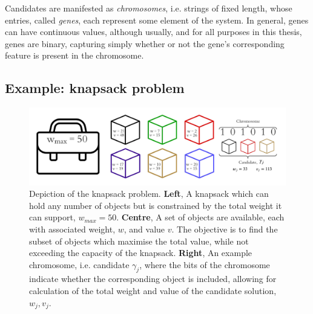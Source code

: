 Candidates are manifested as \emph{\glspl{chromosome}}, i.e. strings of fixed length, 
    whose entries, called  \emph{\glspl{gene}}, each represent some element of the system.
In general, \glspl{gene} can have continuous values, although usually, and for all purposes in this thesis, 
    genes are binary, capturing simply whether or not the \gls{gene}'s corresponding feature is present 
    in the \gls{chromosome}. 

\subsection{Example: knapsack problem}\label{sec:knapsack}
\begin{figure}
    \begin{center}
        \includegraphics[width=\textwidth]{theoretical_study/figures/knapsack_schematic.pdf}
    \end{center}
    \caption[Knapsack problem]{
        Depiction of the knapsack problem.
        \textbf{Left}, A knapsack which can hold any number of objects but is constrained by the total weight it can support, 
        $w_{max} = 50$. 
        \textbf{Centre}, A set of objects are available, each with associated weight, $w$, and value $v$. 
        The objective is to find the subset of objects which maximise the total value, 
        while not exceeding the capacity of the knapsack. 
        \textbf{Right}, An example chromosome, i.e. candidate $\gamma_j$, where the bits of the chromosome indicate 
            whether the corresponding object is included, allowing for calculation of the total weight and value of 
            the candidate solution, $w_{j}, v_{j}$. 
    }

\end{figure}

